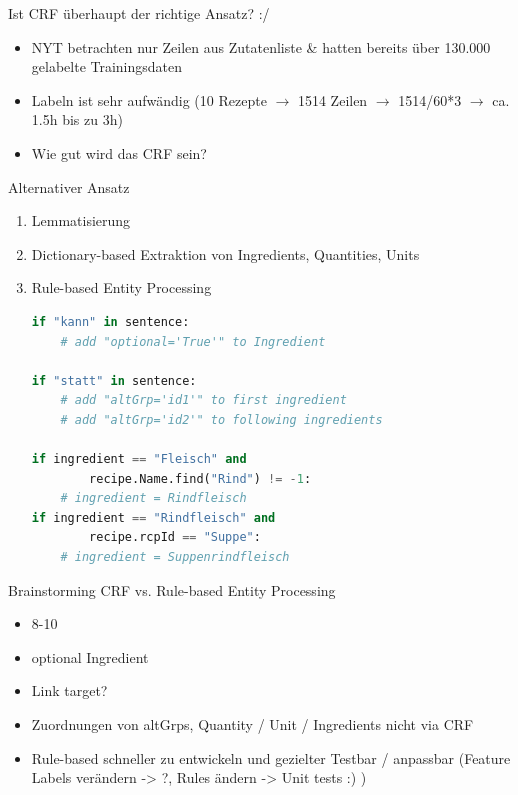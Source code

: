 \documentclass[12pt]{beamer}
\begin{document}
\begin{frame}{Ist CRF überhaupt der richtige Ansatz? :/}
	\begin{itemize}
		\item NYT betrachten nur Zeilen aus Zutatenliste \& hatten bereits über 130.000 gelabelte Trainingsdaten
		\item Labeln ist sehr aufwändig (10 Rezepte $\rightarrow$ 1514 Zeilen $\rightarrow$ 1514/60*3 $\rightarrow$ ca. 1.5h bis zu 3h)
		\item Wie gut wird das CRF sein?
	\end{itemize}
\end{frame}


\begin{frame}[fragile]{Alternativer Ansatz}
	\begin{enumerate}
		\item Lemmatisierung
		\item Dictionary-based Extraktion von Ingredients, Quantities, Units
		\item Rule-based Entity Processing
		\begin{lstlisting}[language=Python]
if "kann" in sentence:
	# add "optional='True'" to Ingredient

if "statt" in sentence:
	# add "altGrp='id1'" to first ingredient
	# add "altGrp='id2'" to following ingredients  
	
if ingredient == "Fleisch" and
		recipe.Name.find("Rind") != -1:
	# ingredient = Rindfleisch
if ingredient == "Rindfleisch" and
		recipe.rcpId == "Suppe":
	# ingredient = Suppenrindfleisch
		\end{lstlisting}
	\end{enumerate}
\end{frame}


\begin{frame}{Brainstorming CRF vs. Rule-based Entity Processing}
	\begin{itemize}
		\item 8-10
		\item optional Ingredient
		\vspace{0.5cm}
		\item Link target?
		\item Zuordnungen von altGrps, Quantity / Unit / Ingredients nicht via CRF
		\item Rule-based schneller zu entwickeln und gezielter Testbar / anpassbar (Feature Labels verändern -> ?, Rules ändern -> Unit tests :) )
	\end{itemize}
\end{frame}
\end{document}
